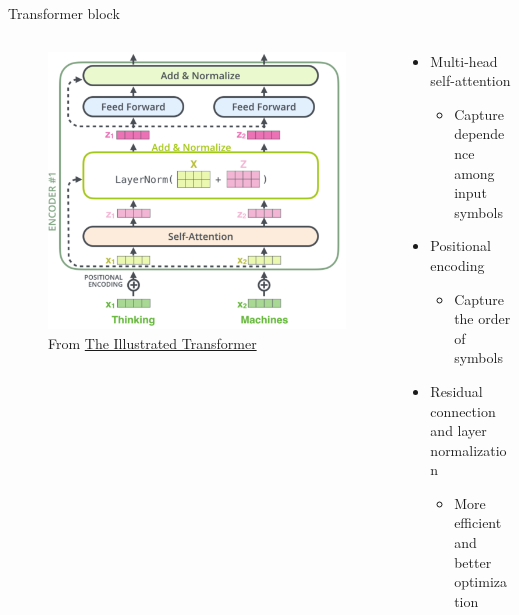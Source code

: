 \documentclass[usenames,dvipsnames,notes,11pt,aspectratio=169,hyperref={colorlinks=true, linkcolor=blue}]{beamer}
\begin{document}
\begin{frame}
    {Transformer block}
    \begin{columns}
        \begin{column}{0.4\textwidth}
            \begin{figure}
                \includegraphics[width=\columnwidth]{figures/transformer-block}
                \caption{From \href{https://jalammar.github.io/illustrated-transformer}{The Illustrated Transformer}}
            \end{figure}
        \end{column}
        \begin{column}{0.6\textwidth}
            \begin{itemize}[<+->]
                \item Multi-head self-attention
                    \begin{itemize}
                        \item Capture dependence among input symbols
                    \end{itemize}
                \item Positional encoding 
                    \begin{itemize}
                        \item Capture the order of symbols 
                    \end{itemize}
                \item Residual connection and layer normalization 
                    \begin{itemize}
                        \item More efficient and better optimization
                    \end{itemize}
            \end{itemize}
        \end{column}
    \end{columns}
\end{frame}
\end{document}
